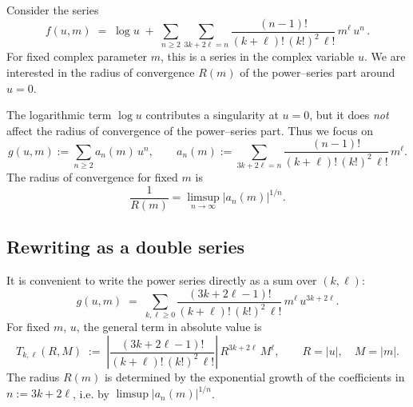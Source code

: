 \documentclass[11pt, a4paper]{article}
\numberwithin{equation}{section}
\begin{document}
Consider the series
\begin{equation}
  f(u,m)
  \;=\;
  \log u \;+\; \sum_{n\ge 2} \sum_{3k+2\ell=n}
  \frac{(n-1)!}{(k+\ell)!\,(k!)^2\,\ell!}\,m^\ell\,u^n\,.
\end{equation}
For fixed complex parameter $m$, this is a series in the complex variable $u$.
We are interested in the radius of convergence $R(m)$ of the power--series part
around $u=0$.

The logarithmic term $\log u$ contributes a singularity at $u=0$, but it does
\emph{not} affect the radius of convergence of the power--series part. Thus we
focus on
\begin{equation}
  g(u,m) := \sum_{n\ge 2} a_n(m)\,u^n,
  \qquad
  a_n(m)
  := \sum_{3k+2\ell=n}
  \frac{(n-1)!}{(k+\ell)!\,(k!)^2\,\ell!}\,m^\ell.
\end{equation}
The radius of convergence for fixed $m$ is
\begin{equation}
  \frac{1}{R(m)}
  = \limsup_{n\to\infty} |a_n(m)|^{1/n}.
\end{equation}

\subsection{Rewriting as a double series}
It is convenient to write the power series directly as a sum over $(k,\ell)$:
\begin{equation}
  g(u,m) \;=\; \sum_{k,\ell\ge 0}
  \frac{(3k+2\ell-1)!}{(k+\ell)!\,(k!)^2\,\ell!}\,
  m^\ell\,u^{3k+2\ell}.
\end{equation}
For fixed $m$, $u$, the general term in absolute value is
\begin{equation}
  T_{k,\ell}(R,M) \;:=\;
  \left|
  \frac{(3k+2\ell-1)!}{(k+\ell)!\,(k!)^2\,\ell!}
  \right|\,
  R^{3k+2\ell}\,M^\ell,
  \qquad
  R = |u|,\quad M = |m|.
\end{equation}
The radius $R(m)$ is determined by the exponential growth of the coefficients in
$n := 3k+2\ell$, i.e. by $\limsup |a_n(m)|^{1/n}$.
\end{document}
